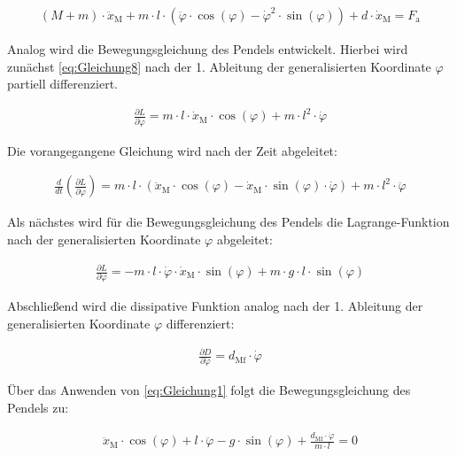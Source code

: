 \documentclass[
	pagesize,
	fontsize=12pt,
	paper=a4,
	oneside,
   reqno
]{scrartcl}
\begin{document}
\begin{align}\label{eq:Gleichung13}
    (M + m) \cdot \ddot x_{\mathrm{M}} + m \cdot l \cdot \left( \ddot \varphi \cdot \cos({\varphi}) - \dot \varphi^2 \cdot \sin({\varphi})\right) + d \cdot \dot x_{\mathrm{M}} = F_{\mathrm{a}}
\end{align}

Analog wird die Bewegungsgleichung des Pendels entwickelt. Hierbei wird zunächst \autoref{eq:Gleichung8} nach der 1. Ableitung der generalisierten Koordinate $\varphi$ partiell differenziert.

\begin{align}\label{eq:Gleichung14}
    \frac{\partial L}{\partial \dot{\varphi}} = m \cdot l \cdot \dot{x}_{\mathrm{M}} \cdot \cos(\varphi) + m \cdot l^2 \cdot \dot{\varphi}
\end{align}

Die vorangegangene Gleichung wird nach der Zeit abgeleitet:

\begin{align}\label{eq:Gleichung15}
    \frac{d}{dt}\left(\frac{\partial L}{\partial \dot{\varphi}}\right) = m \cdot l \cdot \left(\ddot{x}_{\mathrm{M}} \cdot  \cos(\varphi) - \dot{x}_{\mathrm{M}} \cdot \sin(\varphi) \cdot \dot{\varphi}\right) + m \cdot l^2 \cdot \ddot{\varphi}
\end{align}

Als nächstes wird für die Bewegungsgleichung des Pendels die Lagrange-Funktion nach der generalisierten Koordinate $\varphi$ abgeleitet:

\begin{align}\label{eq:Gleichung16}
    \frac{\partial L}{\partial \varphi} = -m \cdot l \cdot \dot{\varphi} \cdot \dot{x}_{\mathrm{M}} \cdot \sin(\varphi) + m \cdot g \cdot l \cdot \sin(\varphi)
\end{align}

Abschließend wird die dissipative Funktion analog nach der 1. Ableitung der generalisierten Koordinate $\varphi$ differenziert:

\begin{align}\label{eq:Gleichung17}
    \frac{\partial D}{\partial \dot{\varphi}} = d_{\mathrm{Mf}} \cdot \dot{\varphi}
\end{align}

Über das Anwenden von \autoref{eq:Gleichung1} folgt die Bewegungsgleichung des Pendels zu:

\begin{align}\label{eq:Gleichung18}
    \ddot{x}_{\mathrm{M}} \cdot \cos(\varphi) + l \cdot \ddot{\varphi} - g \cdot \sin(\varphi) + \frac{d_{\mathrm{Mf}} \cdot \dot{\varphi}}{m \cdot l} = 0
\end{align}
\end{document}

